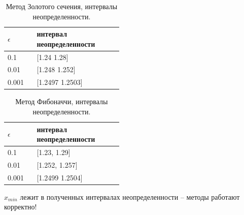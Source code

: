 \documentclass[main.tex]{subfiles}
\begin{document}
	\begin{table}[h]
		\begin{tabular} { | p{0.1\linewidth} | p{0.35\linewidth} |}
			\hline
			$\epsilon$ &  интервал неопределенности  \\ \hline
			0.1 & [1.24 1.28]   \\ \hline
			0.01 & [1.248 1.252] \\ \hline
			0.001 & [1.2497 1.2503]    \\ \hline
		\end{tabular}
		\caption{Метод Золотого сечения, интервалы неопределенности.}
	\end{table}
	
	
	\begin{table}[h]
		\begin{tabular} { | p{0.1\linewidth} | p{0.35\linewidth} |}
			\hline
			$\epsilon$ &  интервал неопределенности  \\ \hline
			0.1 & [1.23, 1.29]   \\ \hline
			0.01 & [1.252, 1.257] \\ \hline
			0.001 & [1.2499 1.2504]    \\ \hline
		\end{tabular}
		\caption{Метод Фибоначчи, интервалы неопределенности.}
	\end{table}
	$x_{min}$ лежит в полученных интервалах неопределенности -- методы работают корректно!

	
\end{document}
